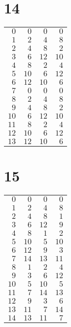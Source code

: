 \documentclass[a4paper]{scrartcl}
\begin{document}
\section*{14}
\begin{tabular}{rrrr}
\toprule
$0$ & $0$ & $0$ & $0$ \\
$1$ & $2$ & $4$ & $8$ \\
$2$ & $4$ & $8$ & $2$ \\
$3$ & $6$ & $12$ & $10$ \\
$4$ & $8$ & $2$ & $4$ \\
$5$ & $10$ & $6$ & $12$ \\
$6$ & $12$ & $10$ & $6$ \\
$7$ & $0$ & $0$ & $0$ \\
$8$ & $2$ & $4$ & $8$ \\
$9$ & $4$ & $8$ & $2$ \\
$10$ & $6$ & $12$ & $10$ \\
$11$ & $8$ & $2$ & $4$ \\
$12$ & $10$ & $6$ & $12$ \\
$13$ & $12$ & $10$ & $6$ \\
\bottomrule
\end{tabular}

\section*{15}
\begin{tabular}{rrrr}
\toprule
$0$ & $0$ & $0$ & $0$ \\
$1$ & $2$ & $4$ & $8$ \\
$2$ & $4$ & $8$ & $1$ \\
$3$ & $6$ & $12$ & $9$ \\
$4$ & $8$ & $1$ & $2$ \\
$5$ & $10$ & $5$ & $10$ \\
$6$ & $12$ & $9$ & $3$ \\
$7$ & $14$ & $13$ & $11$ \\
$8$ & $1$ & $2$ & $4$ \\
$9$ & $3$ & $6$ & $12$ \\
$10$ & $5$ & $10$ & $5$ \\
$11$ & $7$ & $14$ & $13$ \\
$12$ & $9$ & $3$ & $6$ \\
$13$ & $11$ & $7$ & $14$ \\
$14$ & $13$ & $11$ & $7$ \\
\bottomrule
\end{tabular}
\end{document}
